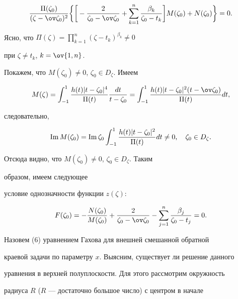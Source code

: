 $$ 


\frac{\Pi(\zeta_0)}{(\zeta-\ov\zeta_0)^2}\bigg\{\bigg[ 


-\frac{2}{\zeta_0-\ov\zeta_0}+\sum^n_{k=1}\frac{\beta_k}{\zeta_0-t_k} 


\bigg]M(\zeta_0)+N(\zeta_0)\bigg\}=0. 


$$ 


 


Ясно, что $\Pi(\zeta)=\prod\limits^n_{k=1}(\zeta-t_k)^{\beta_k}\ne0$ 


при $\zeta\ne t_k$, $k=\ov{1,n}$. 


Покажем, что $M(\zeta_0)\ne0$, $\zeta_0\in D_\zeta$. Имеем 


$$ 


M(\zeta)=\int^1_{-1}\frac{h(t)|t-\zeta_0|^4}{\Pi(t)} 


\frac{dt}{t-\zeta_0}=\int^1_{-1} 


\frac{h(t)|t-\zeta_0|^2(t-\ov\zeta_0)}{\Pi(t)}dt, 


$$ 


следовательно, 


$$ 


\im M(\zeta_0)=\im \zeta_0\int^1_{-1} 


\frac{h(t)|t-\zeta_0|^2}{\Pi(t)}dt\ne0,\quad \zeta_0\in D_\zeta. 


$$ 


Отсюда видно, что $M(\zeta_0)\ne0$, $\zeta_0\in D_\zeta$. Таким 


образом, имеем следующее 


условие однозначности функции $z(\zeta)$: 


\begin{equation} 


F(\zeta_0)=-\frac{N(\zeta_0)}{M(\zeta_0)}+\frac{2}{\zeta_0-\ov\zeta_0} 


-\sum^n_{j=1}\frac{\beta_j}{\zeta_0-t_j}=0. 


\end{equation} 


 


Назовем (6) уравнением Гахова для внешней смешанной обратной 


краевой задачи по параметру $x$. Выясним, существует ли решение данного 


уравнения в верхней полуплоскости. Для этого рассмотрим окружность 


радиуса $R$ ($R$ --- достаточно большое число) с центром в начале 


